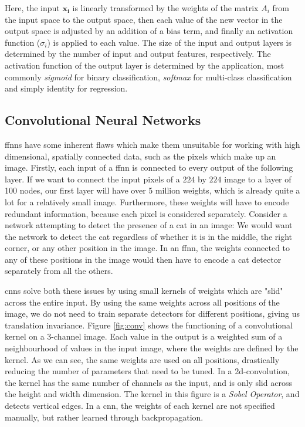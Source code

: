 \documentclass[UKenglish]{uiomasterthesis} %
\theoremstyle{definition}
\begin{document}
\noindent Here, the input $\bm{x_i}$ is linearly transformed by the weights of the matrix $A_i$ from the input space to the output space, then each value of the new vector in the output space is adjusted by an addition of a bias term, and finally an activation function ($\sigma_i$) is applied to each value. The size of the input and output layers is determined by the number of input and output features, respectively. The activation function of the output layer is determined by the application, most commonly {\it sigmoid} for binary classification, {\it softmax} for multi-class classification and simply identity for regression.


\subsection{Convolutional Neural Networks} \label{section:cnn}

\acp{ffnn} have some inherent flaws which make them unsuitable for working with high dimensional, spatially connected data, such as the pixels which make up an image. Firstly, each input of a \ac{ffnn} is connected to every output of the following layer. If we want to connect the input pixels of a $224$ by $224$ image to a layer of 100 nodes, our first layer will have over 5 million weights, which is already quite a lot for a relatively small image. Furthermore, these weights will have to encode redundant information, because each pixel is considered separately. Consider a network attempting to detect the presence of a cat in an image: We would want the network to detect the cat regardless of whether it is in the middle, the right corner, or any other position in the image. In an \ac{ffnn}, the weights connected to any of these positions in the image would then have to encode a cat detector separately from all the others.

\acp{cnn} solve both these issues by using small kernels of weights which are "slid" across the entire input. By using the same weights across all positions of the image, we do not need to train separate detectors for different positions, giving us translation invariance. Figure \ref{fig:conv} shows the functioning of a convolutional kernel on a 3-channel image. Each value in the output is a weighted sum of a neighbourhood of values in the input image, where the weights are defined by the kernel. As we can see, the same weights are used on all positions, drastically reducing the number of parameters that need to be tuned. In a 2d-convolution, the kernel has the same number of channels as the input, and is only slid across the height and width dimension. The kernel in this figure is a {\it Sobel Operator}, and detects vertical edges. In a \ac{cnn}, the weights of each kernel are not specified manually, but rather learned through backpropagation.
\end{document}
